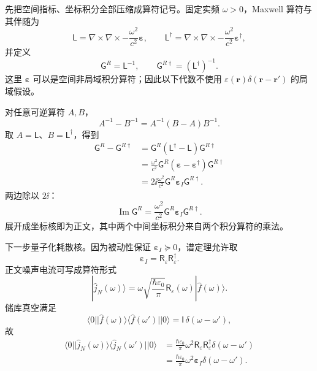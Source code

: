 



\begin{derivation}
先把空间指标、坐标积分全部压缩成算符记号。固定实频 $\omega>0$，Maxwell 算符与其伴随为
\[
\mathsf L
=\nabla\times\nabla\times
-\frac{\omega^2}{c^2}\boldsymbol\varepsilon,
\qquad
\mathsf L^\dagger
=\nabla\times\nabla\times
-\frac{\omega^2}{c^2}\boldsymbol\varepsilon^\dagger,
\]
并定义
\[
\mathsf G^R=\mathsf L^{-1},
\qquad
\mathsf G^{R\dagger}=(\mathsf L^\dagger)^{-1}.
\]
这里 $\boldsymbol\varepsilon$ 可以是空间非局域积分算符；因此以下代数不使用
$\varepsilon(\mathbf r)\delta(\mathbf r-\mathbf r')$ 的局域假设。

对任意可逆算符 $A,B$，
\[
A^{-1}-B^{-1}=A^{-1}(B-A)B^{-1}.
\]
取 $A=\mathsf L$、$B=\mathsf L^\dagger$，得到
\begin{align*}
\mathsf G^R-\mathsf G^{R\dagger}
&=\mathsf G^R(\mathsf L^\dagger-\mathsf L)\mathsf G^{R\dagger}\\
&=\frac{\omega^2}{c^2}
\mathsf G^R(\boldsymbol\varepsilon-\boldsymbol\varepsilon^\dagger)
\mathsf G^{R\dagger}\\
&=2\ii\frac{\omega^2}{c^2}
\mathsf G^R\boldsymbol\varepsilon_I\mathsf G^{R\dagger}.
\end{align*}
两边除以 $2\ii$：
\[
\operatorname{Im}\mathsf G^R
=\frac{\omega^2}{c^2}
\mathsf G^R\boldsymbol\varepsilon_I\mathsf G^{R\dagger}.
\]
展开成坐标核即为正文，其中两个中间坐标积分来自两个积分算符的乘法。

下一步量子化耗散核。因为被动性保证
$\boldsymbol\varepsilon_I\succeq0$，谱定理允许取
\[
\boldsymbol\varepsilon_I
=\mathsf R_\varepsilon\mathsf R_\varepsilon^\dagger.
\]
正文噪声电流可写成算符形式
\[
|\hat j_N(\omega)\rangle
=\omega\sqrt{\frac{\hbar\varepsilon_0}{\pi}}
\mathsf R_\varepsilon(\omega)|\hat f(\omega)\rangle.
\]
储库真空满足
\[
\langle0|
|\hat f(\omega)\rangle\langle\hat f(\omega')|
|0\rangle
=\mathsf I\,\delta(\omega-\omega'),
\]
故
\begin{align*}
\langle0|
|\hat j_N(\omega)\rangle\langle\hat j_N(\omega')|
|0\rangle
&=\frac{\hbar\varepsilon_0}{\pi}\omega^2
\mathsf R_\varepsilon\mathsf R_\varepsilon^\dagger
\delta(\omega-\omega')\\
&=\frac{\hbar\varepsilon_0}{\pi}\omega^2
\boldsymbol\varepsilon_I
\delta(\omega-\omega').
\end{align*}


\end{derivation}
